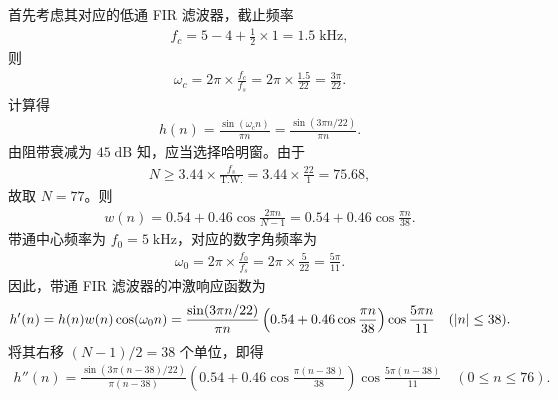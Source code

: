 \begin{solution}
    首先考虑其对应的低通 FIR 滤波器，截止频率
    \begin{align*}
        f_c = 5 - 4 + \frac{1}{2} \times 1 = 1.5\;\mathrm{kHz},
    \end{align*}
    则
    \begin{align*}
        \omega_c = 2\pi \times \frac{f_c}{f_s} = 2\pi \times \frac{1.5}{22} = \frac{3\pi}{22}.
    \end{align*}
    计算得
    \begin{align*}
        h(n) = \frac{\sin(\omega_c n)}{\pi n} = \frac{\sin(3\pi n / 22)}{\pi n}.
    \end{align*}
    由阻带衰减为 $45\;\mathrm{dB}$ 知，应当选择哈明窗。由于
    \begin{align*}
        N \ge 3.44 \times \frac{f_s}{\text{T.W.}} = 3.44 \times \frac{22}{1} = 75.68,
    \end{align*}
    故取 $N = 77$。则
    \begin{align*}
        w(n) = 0.54 + 0.46\cos\frac{2\pi n}{N - 1} = 0.54 + 0.46\cos\frac{\pi n}{38}.
    \end{align*}
    带通中心频率为 $f_0 = 5\;\mathrm{kHz}$，对应的数字角频率为
    \begin{align*}
        \omega_0 = 2\pi \times \frac{f_0}{f_s} = 2\pi \times \frac{5}{22} = \frac{5\pi}{11}.
    \end{align*}
    因此，带通 FIR 滤波器的冲激响应函数为
    \begin{align*}
        h'(n) = h(n) w(n) \cos(\omega_0 n) = \frac{\sin(3\pi n / 22)}{\pi n} \left(0.54 + 0.46\cos\frac{\pi n}{38}\right) \cos\frac{5\pi n}{11} \quad (\left|n\right| \le 38).
    \end{align*}
    将其右移 $(N - 1) / 2 = 38$ 个单位，即得
    \begin{align*}
        h''(n) = \frac{\sin(3\pi (n - 38) / 22)}{\pi (n - 38)} \left(0.54 + 0.46\cos\frac{\pi (n - 38)}{38}\right) \cos\frac{5\pi (n - 38)}{11} \quad (0 \le n \le 76).
    \end{align*}
\end{solution}


